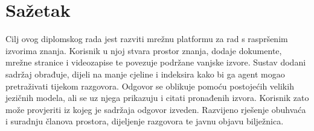 \setcounter{page}{1}
\section*{\fontsize{18}{17}\selectfont Sažetak}
Cilj ovog diplomskog rada jest razviti mrežnu platformu za rad s raspršenim izvorima znanja. Korisnik u njoj stvara prostor znanja, dodaje dokumente, mrežne stranice i videozapise te povezuje podržane vanjske izvore. Sustav dodani sadržaj obrađuje, dijeli na manje cjeline i indeksira kako bi ga agent mogao pretraživati tijekom razgovora. Odgovor se oblikuje pomoću postojećih velikih jezičnih modela, ali se uz njega prikazuju i citati pronađenih izvora. Korisnik zato može provjeriti iz kojeg je sadržaja odgovor izveden. Razvijeno rješenje obuhvaća i suradnju članova prostora, dijeljenje razgovora te javnu objavu bilježnica.

\vspace{0.5cm}

